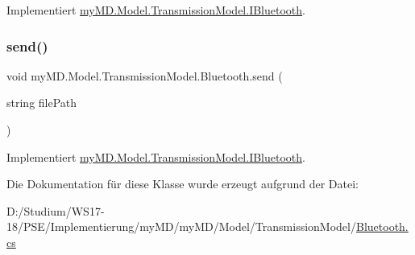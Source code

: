 Implementiert \mbox{\hyperlink{interfacemy_m_d_1_1_model_1_1_transmission_model_1_1_i_bluetooth_adfa691c5290cab1d92390f585cc9abdb}{my\+M\+D.\+Model.\+Transmission\+Model.\+I\+Bluetooth}}.

\mbox{\label{classmy_m_d_1_1_model_1_1_transmission_model_1_1_bluetooth_a5be7341663a848cdc5bd2209c11890ad}} 
\subsubsection{\texorpdfstring{send()}{send()}}
{\footnotesize\ttfamily void my\+M\+D.\+Model.\+Transmission\+Model.\+Bluetooth.\+send (\begin{DoxyParamCaption}\item[{string}]{file\+Path }\end{DoxyParamCaption})}



Implementiert \mbox{\hyperlink{interfacemy_m_d_1_1_model_1_1_transmission_model_1_1_i_bluetooth_a3ae2f74750177a849765df54ea32f788}{my\+M\+D.\+Model.\+Transmission\+Model.\+I\+Bluetooth}}.



Die Dokumentation für diese Klasse wurde erzeugt aufgrund der Datei\+:\begin{DoxyCompactItemize}
\item 
D\+:/\+Studium/\+W\+S17-\/18/\+P\+S\+E/\+Implementierung/my\+M\+D/my\+M\+D/\+Model/\+Transmission\+Model/\mbox{\hyperlink{_bluetooth_8cs}{Bluetooth.\+cs}}\end{DoxyCompactItemize}
